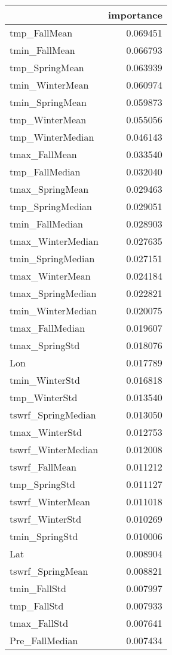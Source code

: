 \begin{tabular}{lr}
\toprule
 & importance \\
\midrule
tmp_FallMean & 0.069451 \\
tmin_FallMean & 0.066793 \\
tmp_SpringMean & 0.063939 \\
tmin_WinterMean & 0.060974 \\
tmin_SpringMean & 0.059873 \\
tmp_WinterMean & 0.055056 \\
tmp_WinterMedian & 0.046143 \\
tmax_FallMean & 0.033540 \\
tmp_FallMedian & 0.032040 \\
tmax_SpringMean & 0.029463 \\
tmp_SpringMedian & 0.029051 \\
tmin_FallMedian & 0.028903 \\
tmax_WinterMedian & 0.027635 \\
tmin_SpringMedian & 0.027151 \\
tmax_WinterMean & 0.024184 \\
tmax_SpringMedian & 0.022821 \\
tmin_WinterMedian & 0.020075 \\
tmax_FallMedian & 0.019607 \\
tmax_SpringStd & 0.018076 \\
Lon & 0.017789 \\
tmin_WinterStd & 0.016818 \\
tmp_WinterStd & 0.013540 \\
tswrf_SpringMedian & 0.013050 \\
tmax_WinterStd & 0.012753 \\
tswrf_WinterMedian & 0.012008 \\
tswrf_FallMean & 0.011212 \\
tmp_SpringStd & 0.011127 \\
tswrf_WinterMean & 0.011018 \\
tswrf_WinterStd & 0.010269 \\
tmin_SpringStd & 0.010006 \\
Lat & 0.008904 \\
tswrf_SpringMean & 0.008821 \\
tmin_FallStd & 0.007997 \\
tmp_FallStd & 0.007933 \\
tmax_FallStd & 0.007641 \\
Pre_FallMedian & 0.007434 \\

\end{tabular}
